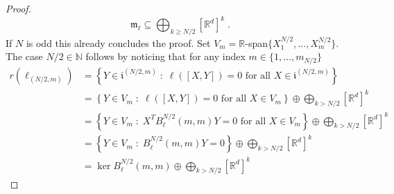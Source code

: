 \documentclass[pdflatex,sn-mathphys-num]{sn-jnl}
\theoremstyle{thmstyletwo}
\theoremstyle{thmstyleone}
\newtheorem{lemma}[definition]{Lemma}
\theoremstyle{thmstyletwo}
\newcommand{\fancyg}{\mathfrak{g}}
\newcommand{\fancym}{\mathfrak{m}}
\begin{document}
\begin{proof}
		\[\fancym_{\ell} \subseteq \bigoplus_{k \geq N/2} [\mathbb{R}^d]^k \;.\]
		If $N$ is odd this already concludes the proof. Set $V_m = \mathbb{R}$-span$\{X_1^{N/2}, \ldots, X_m^{N/2}\}$. The case $N/2 \in \mathbb{N}$ follows by noticing that for any index $m \in \{1, \ldots, m_{N/2}\}$
		\begin{align*}
			r(\ell_{(N/2,m)})&= \left\{Y \in \mathfrak{i}^{(N/2,m)} \; : \; \ell([X,Y]) = 0 \text{ for all } X \in \mathfrak{i}^{(N/2,m)}\right\}\\
			&= \left\{Y \in V_m \; : \; \ell([X,Y]) = 0 \text{ for all } X \in V_m \right\} \oplus  \bigoplus_{k > N/2} [\mathbb{R}^d]^k\\
			&= \left\{Y \in V_m \; : \; X^T B_{\ell}^{N/2}(m,m)Y = 0 \text{ for all } X \in V_m \right\} \oplus  \bigoplus_{k > N/2} [\mathbb{R}^d]^k\\
			&= \left\{Y \in V_m \; : \;B_{\ell}^{N/2}(m,m)Y =0 \right\} \oplus  \bigoplus_{k > N/2} [\mathbb{R}^d]^k\\
			&= \ker B_{\ell}^{N/2}(m,m) \oplus  \bigoplus_{k > N/2} [\mathbb{R}^d]^k
		\end{align*}
	\end{proof}
	
\end{document}

